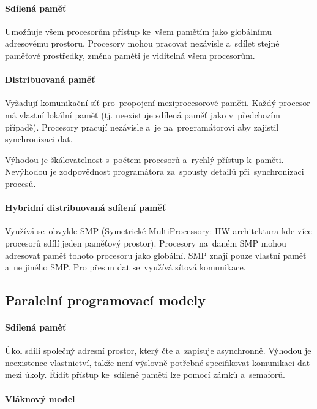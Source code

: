 \paragraph{Sdílená paměť}

Umožňuje všem procesorům přístup ke~všem pamětím jako globálnímu adresovému prostoru. Procesory mohou pracovat nezávisle a~sdílet stejné paměťové prostředky, změna paměti je viditelná všem procesorům.

\paragraph{Distribuovaná paměť}

Vyžadují komunikační síť pro~propojení meziprocesorové paměti. Každý procesor má vlastní lokální paměť (tj. neexistuje sdílená paměť jako v~předchozím případě). Procesory pracují nezávisle a~je na~programátorovi aby zajistil synchronizaci dat.

Výhodou je škálovatelnost s~počtem procesorů a~rychlý přístup k~paměti. Nevýhodou je zodpovědnost programátora za~spousty detailů při~synchronizaci procesů.

\paragraph{Hybridní distribuovaná sdílení paměť}

Využívá se~obvykle SMP (Symetrické MultiProcessory: HW architektura kde více procesorů sdílí jeden paměťový prostor). Procesory na~daném SMP mohou adresovat paměť tohoto procesoru jako globální. SMP znají pouze vlastní paměť a~ne jiného SMP. Pro přesun dat se~využívá sítová komunikace.

\subsection{Paralelní programovací modely}

\paragraph{Sdílená paměť}

Úkol sdílí společný adresní prostor, který čte a~zapisuje asynchronně. Výhodou je neexistence vlastnictví, takže není výslovně potřebné specifikovat komunikaci dat mezi úkoly. Řídit přístup ke~sdílené paměti lze pomocí zámků a~semaforů.

\paragraph{Vláknový model}

